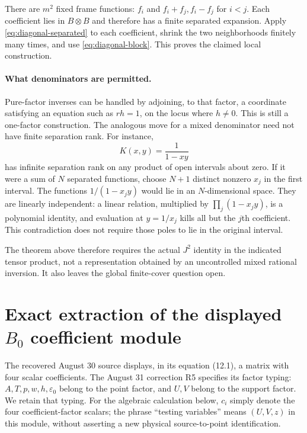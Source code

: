 There are $m^2$ fixed frame functions:
$f_i$ and $f_i+f_j,f_i-f_j$ for $i<j$. Each coefficient lies in
$B\otimes B$ and therefore has a finite separated expansion.
Apply \eqref{eq:diagonal-separated} to each coefficient, shrink the
two neighborhoods finitely many times, and use
\eqref{eq:diagonal-block}. This proves the claimed local construction.

\paragraph{What denominators are permitted.}
Pure-factor inverses can be handled by adjoining, to that factor,
a coordinate satisfying an equation such as $rh=1$, on the locus
where $h\ne0$. This is still a one-factor construction. The analogous
move for a mixed denominator need not have finite separation rank.
For instance,
\[
 K(x,y)=\frac1{1-xy}
\]
has infinite separation rank on any product of open intervals about
zero. If it were a sum of $N$ separated functions, choose $N+1$
distinct nonzero $x_j$ in the first interval. The functions
$1/(1-x_jy)$ would lie in an $N$-dimensional space. They are linearly
independent: a linear relation, multiplied by
$\prod_j(1-x_jy)$, is a polynomial identity, and evaluation at
$y=1/x_j$ kills all but the $j$th coefficient. This contradiction
does not require those poles to lie in the original interval.

The theorem above therefore requires the actual $J^2$ identity in
the indicated tensor product, not a representation obtained by an
uncontrolled mixed rational inversion. It also leaves the global
finite-cover question open.

\section{Exact extraction of the displayed \texorpdfstring{$B_0$}{B0} coefficient module}
\label{sec:b0-module}

The recovered August 30 source displays, in its equation (12.1), a
matrix with four scalar coefficients. The August 31 correction R5
specifies its factor typing: $A,T,p,w,h,\varepsilon_0$ belong to the
point factor, and $U,V$ belong to the support factor. We retain that
typing. For the algebraic calculation below, $c_i$ simply denote
the four coefficient-factor scalars; the phrase ``testing variables''
means $(U,V,z)$ in this module, without asserting a new physical
source-to-point identification.

